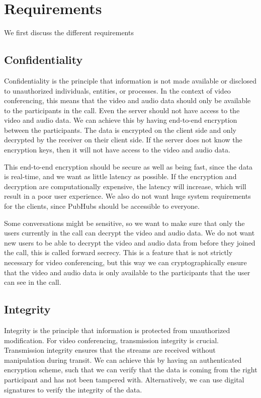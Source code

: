 \documentclass{report}
\begin{document}
\chapter{Requirements}\label{chap:requirements}
We first discuss the different requirements 

\section{Confidentiality}
Confidentiality is the principle that information is not made available or disclosed to unauthorized individuals,
entities, or processes. In the context of video conferencing, this means that the video and audio data should only
be available to the participants in the call. Even the server should not have access to the video and audio data. We
can achieve this by having end-to-end encryption between the participants. The data is encrypted on the client side and
only decrypted by the receiver on their client side. If the server does not know the encryption keys, then it will
not have access to the video and audio data.

This end-to-end encryption should be secure as well as being fast, since the data is real-time, and we want as little
latency as possible. If the encryption and decryption are computationally expensive, the latency will increase,
which will result in a poor user experience. We also do not want huge system requirements for the clients, since
PubHubs should be accessible to everyone.

Some conversations might be sensitive, so we want to make sure that only the users currently in the call can
decrypt the video and audio data. We do not want new users to be able to decrypt the video and audio data from
before they joined the call, this is called forward secrecy. This is a feature that is not strictly necessary for
video conferencing, but this way we can cryptographically ensure that the video and audio data is only available to
the participants that the user can see in the call.

\section{Integrity}
Integrity is the principle that information is protected from unauthorized modification. For video conferencing, transmission integrity
is crucial. Transmission integrity ensures that the streams are received without manipulation during transit.
We can achieve this by having an authenticated encryption scheme, such that we can verify that the data is coming from
the right participant and has not been tampered with. Alternatively, we can use digital signatures to verify the
integrity of the data.
\end{document}
